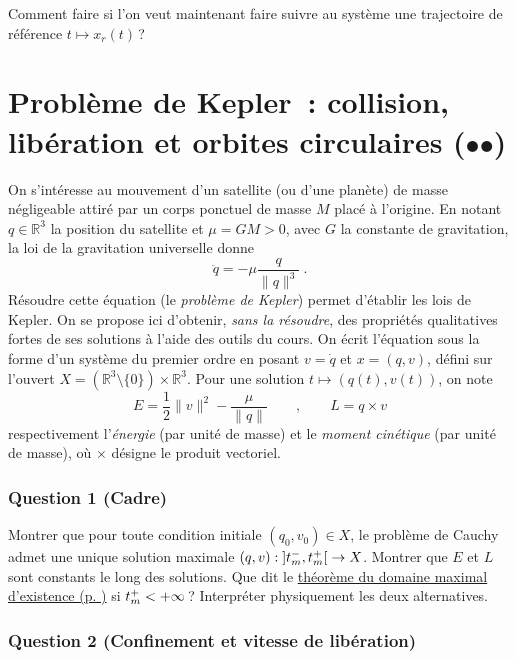 Comment faire si l'on veut maintenant faire suivre au système une
trajectoire de référence \(t\mapsto x_r(t)\)\,?

\hypertarget{exo_kepler}{%
\section{\texorpdfstring{Problème de Kepler~: collision, libération et
orbites circulaires
(\(\mathord{\bullet}\mathord{\bullet}\))}{Problème de Kepler : collision, libération et orbites circulaires (••)}}\label{exo_kepler}}

On s'intéresse au mouvement d'un satellite (ou d'une planète) de masse
négligeable attiré par un corps ponctuel de masse \(M\) placé à
l'origine. En notant \(q\in \mathbb{R}^3\) la position du satellite et
\(\mu = G M>0\), avec \(G\) la constante de gravitation, la loi de la
gravitation universelle donne \[
\ddot{q} = -\mu \frac{q}{\|q\|^3} \ .
\] Résoudre cette équation (le \emph{problème de Kepler}) permet
d'établir les lois de Kepler. On se propose ici d'obtenir, \emph{sans la
résoudre}, des propriétés qualitatives fortes de ses solutions à l'aide
des outils du cours. On écrit l'équation sous la forme d'un système du
premier ordre en posant \(v=\dot q\) et \(x=(q,v)\), défini sur l'ouvert
\(X = \left(\mathbb{R}^3\setminus\{0\}\right)\times \mathbb{R}^3\). Pour
une solution \(t\mapsto (q(t),v(t))\), on note \[
E = \frac{1}{2}\|v\|^2 - \frac{\mu}{\|q\|} \qquad , \qquad L = q\times v
\] respectivement l'\emph{énergie} (par unité de masse) et le
\emph{moment cinétique} (par unité de masse), où \(\times\) désigne le
produit vectoriel.

\hypertarget{kepler-1}{%
\subsubsection*{Question 1 (Cadre)}\label{kepler-1}}


Montrer que pour toute condition initiale \((q_0,v_0)\in X\), le
problème de Cauchy admet une unique solution maximale
\((q,v):\left]t_m^-,t_m^+\right[\to X\). Montrer que \(E\) et \(L\) sont
constants le long des solutions. Que dit le
\protect\hyperlink{theo_bouts}{théorème du domaine maximal d'existence
(p. \pageref*{theo_bouts})} si \(t_m^+<+\infty\)\,? Interpréter
physiquement les deux alternatives.

\hypertarget{kepler-2}{%
\subsubsection*{Question 2 (Confinement et vitesse de
libération)}\label{kepler-2}}

